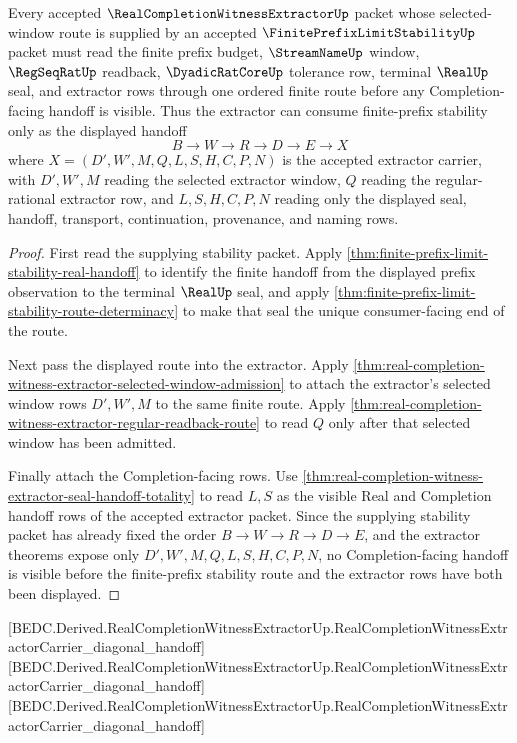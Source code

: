 \begin{theorem}
\label{thm:real-completion-witness-extractor-prefix-stability-handoff}
Every accepted $\RealCompletionWitnessExtractorUp$ packet whose selected-window route is supplied by an accepted $\FinitePrefixLimitStabilityUp$ packet must read the finite prefix budget, $\StreamNameUp$ window, $\RegSeqRatUp$ readback, $\DyadicRatCoreUp$ tolerance row, terminal $\RealUp$ seal, and extractor rows through one ordered finite route before any Completion-facing handoff is visible. Thus the extractor can consume finite-prefix stability only as the displayed handoff
$$
B \to W \to R \to D \to E \to X
$$
where $X=(D',W',M,Q,L,S,H,C,P,N)$ is the accepted extractor carrier, with $D',W',M$ reading the selected extractor window, $Q$ reading the regular-rational extractor row, and $L,S,H,C,P,N$ reading only the displayed seal, handoff, transport, continuation, provenance, and naming rows.
\end{theorem}
\begin{proof}
First read the supplying stability packet. Apply \autoref{thm:finite-prefix-limit-stability-real-handoff} to identify the finite handoff from the displayed prefix observation to the terminal $\RealUp$ seal, and apply \autoref{thm:finite-prefix-limit-stability-route-determinacy} to make that seal the unique consumer-facing end of the route.

Next pass the displayed route into the extractor. Apply \autoref{thm:real-completion-witness-extractor-selected-window-admission} to attach the extractor's selected window rows $D',W',M$ to the same finite route. Apply \autoref{thm:real-completion-witness-extractor-regular-readback-route} to read $Q$ only after that selected window has been admitted.

Finally attach the Completion-facing rows. Use \autoref{thm:real-completion-witness-extractor-seal-handoff-totality} to read $L,S$ as the visible Real and Completion handoff rows of the accepted extractor packet. Since the supplying stability packet has already fixed the order $B \to W \to R \to D \to E$, and the extractor theorems expose only $D',W',M,Q,L,S,H,C,P,N$, no Completion-facing handoff is visible before the finite-prefix stability route and the extractor rows have both been displayed.
\end{proof}

[BEDC.Derived.RealCompletionWitnessExtractorUp.RealCompletionWitnessExtractorCarrier\_diagonal\_handoff]
[BEDC.Derived.RealCompletionWitnessExtractorUp.RealCompletionWitnessExtractorCarrier\_diagonal\_handoff]
[BEDC.Derived.RealCompletionWitnessExtractorUp.RealCompletionWitnessExtractorCarrier\_diagonal\_handoff]


